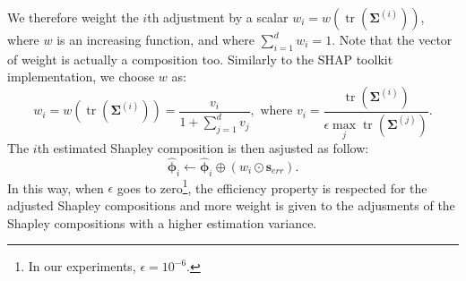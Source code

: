 \documentclass{article}
\theoremstyle{plain}
\theoremstyle{definition}
\theoremstyle{remark}
\DeclareMathOperator{\tr}{tr}
\begin{document}
We therefore weight the $i$th adjustment by a scalar $w_i = w\left(\tr\left(\bm{\Sigma}^{(i)}\right)\right)$, where $w$ is an increasing function, and where $\displaystyle \sum_{i=1}^d w_i= 1$. Note that the vector of weight is actually a composition too. Similarly to the SHAP toolkit implementation, we choose $w$ as:
\begin{equation}
  w_i = w\left(\tr\left(\bm{\Sigma}^{(i)}\right)\right) = \frac{v_i}{\displaystyle 1+\sum_{j=1}^{d}v_j},\text{ where } v_i = \frac{\tr\left(\bm{\Sigma}^{(i)}\right)}{\displaystyle \epsilon \max_j \tr\left(\bm{\Sigma}^{(j)}\right)}.
\end{equation}
The $i$th estimated Shapley composition is then asjusted as follow:
\begin{equation}
  \hat{\bm{\phi}}_i \leftarrow \hat{\bm{\phi}}_i \oplus \left( w_i \odot \bm{s}_{err}\right).
\end{equation}
In this way, when $\epsilon$ goes to zero\footnote{In our experiments, $\epsilon = 10^{-6}$.}, the efficiency property is respected for the adjusted Shapley compositions and more weight is given to the adjusments of the Shapley compositions with a higher estimation variance.
\end{document}
